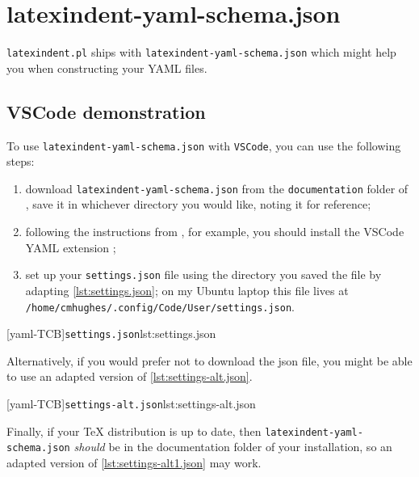  \section{latexindent-yaml-schema.json}

  \texttt{latexindent.pl}
   ships with
  \texttt{latexindent-yaml-schema.json}
  which might help you when constructing your YAML files.

 \subsection{VSCode demonstration}
  To use \texttt{latexindent-yaml-schema.json} with \texttt{VSCode}, you can use the
  following steps:  
  \begin{enumerate}
   \item download \texttt{latexindent-yaml-schema.json} from the \texttt{documentation}
         folder of \cite{latexindent-home}, save it in whichever directory you would
         like, noting it for reference;
   \item following the instructions from \cite{vscode-yaml-demo}, for example, you should
         install the VSCode YAML extension \cite{vscode-yaml-extentions};
   \item set up your \texttt{settings.json} file using the directory you saved the file
         by adapting \cref{lst:settings.json}; on my Ubuntu laptop this file lives at
         \texttt{/home/cmhughes/.config/Code/User/settings.json}.
  \end{enumerate}

  \begin{widepage}
   [yaml-TCB]{\texttt{settings.json}}{lst:settings.json}
  \end{widepage}

  Alternatively, if you would prefer not to download the json file, you might be able to
  use an adapted version of \cref{lst:settings-alt.json}.

  \begin{widepage}
   [yaml-TCB]{\texttt{settings-alt.json}}{lst:settings-alt.json}
  \end{widepage}

  Finally, if your TeX distribution is up to date, then
  \texttt{latexindent-yaml-schema.json} \emph{should} be in the documentation folder of
  your installation, so an adapted version of \cref{lst:settings-alt1.json} may work.


